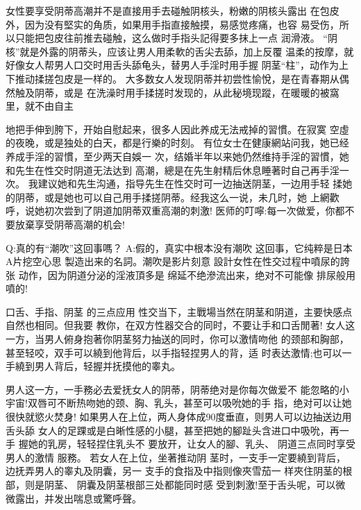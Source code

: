 \documentclass[12pt,UTF8]{ctexbook}
\begin{document}
女性要享受阴蒂高潮并不是直接用手去碰触阴核头，粉嫩的阴核头露出
在包皮外，因为没有堅实的角质，如果用手指直接触摸，易感觉疼痛，也容
易受伤，所以只能把包皮往前推去碰触，这么做时手指头記得要多抹上一点
润滑液。
“阴核”就是外露的阴蒂头，应该让男人用柔軟的舌尖去舔，加上反覆
温柔的按摩，就好像女人帮男人口交时用舌头舔龟头，替男人手淫时用手握
阴茎“柱”，动作为上下推动揉搓包皮是一样的。
大多数女人发现阴蒂并初尝性愉悅，是在青春期从偶然触及阴蒂，或是
在洗澡时用手揉搓时发现的，从此秘境现蹤，在暖暖的被窩里，就不由自主

地把手伸到胯下，开始自慰起来，很多人因此养成无法戒掉的習慣。在寂寞
空虛的夜晚，或是独处的白天，都是行樂的时刻。
有位女士在健康網站问我，她已经养成手淫的習慣，至少两天自娛一
次，结婚半年以来她仍然维持手淫的習慣，她和先生在性交时阴道无法达到
高潮，總是在先生射精后休息睡著时自己再手淫一次。
我建议她和先生沟通，指导先生在性交时可一边抽送阴茎，一边用手轻
揉她的阴蒂，或是她也可以自己用手揉搓阴蒂。经我这么一说，未几时，她
上網歡呼，说她初次尝到了阴道加阴蒂双重高潮的刺激!
医师的叮嚀:每一次做爱，你都不要放棄享受阴蒂高潮的机会!

Q:真的有“潮吹”这回事嗎？
A:假的，真实中根本没有潮吹
这回事，它纯粹是日本A片挖空心思
製造出来的名詞。潮吹是影片刻意
設計女性在性交过程中噴尿的誇张
动作，因为阴道分泌的淫液頂多是
绵延不绝滲流出来，绝对不可能像
排尿般用噴的!

口舌、手指、阴茎
的三点应用
性交当下，主戰場当然在阴茎和阴道，主要快感点自然也相同。但我要
教你，在双方性器交合的同时，不要让手和口舌閒著!
女人这一方，当男人俯身抱著你阴茎努力抽送的同时，你可以激情吻他
的颈部和胸部，甚至轻咬，双手可以繞到他背后，以手指轻捏男人的背，适
时表达激情;也可以一手繞到男人背后，轻握并抚摸他的睾丸。

男人这一方，一手務必去爱抚女人的阴蒂，阴蒂绝对是你每次做爱不
能忽略的小宇宙!双唇可不断热吻她的颈、胸、乳头，甚至可以吸吮她的手
指，绝对可以让她很快就慾火焚身!
如果男人在上位，两人身体成90度垂直，则男人可以边抽送边用舌头舔
女人的足踝或是白晰性感的小腿，甚至把她的腳趾头含进口中吸吮，再一手
握她的乳房，轻轻捏住乳头不
要放开，让女人的腳、乳头、
阴道三点同时享受男人的激情
服務。
若女人在上位，坐著推动阴
茎时，一支手一定要繞到背后，
边抚弄男人的睾丸及阴囊，另一
支手的食指及中指则像夾雪茄一
样夾住阴茎的根部，则是阴茎、
阴囊及阴茎根部三处都能同时感
受到刺激!至于舌头呢，可以微
微露出，并发出喘息或驚呼聲。
\end{document}

